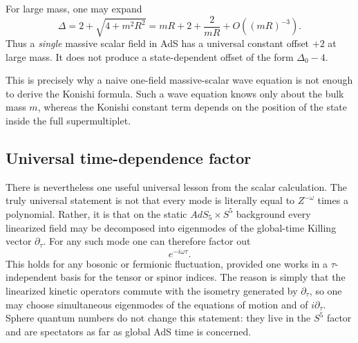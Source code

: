 \documentclass[12pt]{article}
\newcommand{\D}{\Delta}
\begin{document}
For large mass, one may expand
\begin{equation}
\D
=
2+\sqrt{4+m^2R^2}
=
mR+2+\frac{2}{mR}+O((mR)^{-3}).
\end{equation}
Thus a \emph{single} massive scalar field in AdS has a universal constant offset $+2$ at large mass.
It does not produce a state-dependent offset of the form $\D_0-4$.

This is precisely why a naive one-field massive-scalar wave equation is not enough to derive the Konishi
formula.  Such a wave equation knows only about the bulk mass $m$, whereas the Konishi constant term
depends on the position of the state inside the full supermultiplet.

\subsection*{Universal time-dependence factor}

There is nevertheless one useful universal lesson from the scalar calculation.  The truly universal
statement is not that every mode is literally equal to $Z^{-\omega}$ times a polynomial.  Rather, it is
that on the static $AdS_5\times S^5$ background every linearized field may be decomposed into eigenmodes
of the global-time Killing vector $\partial_\tau$.  For any such mode one can therefore factor out
\begin{equation}
e^{-i\omega\tau}.
\end{equation}
This holds for any bosonic or fermionic fluctuation, provided one works in a $\tau$-independent basis for
the tensor or spinor indices.  The reason is simply that the linearized kinetic operators commute with
the isometry generated by $\partial_\tau$, so one may choose simultaneous eigenmodes of the equations of
motion and of $i\partial_\tau$.  Sphere quantum numbers do not change this statement: they live in the
$S^5$ factor and are spectators as far as global AdS time is concerned.
\end{document}
